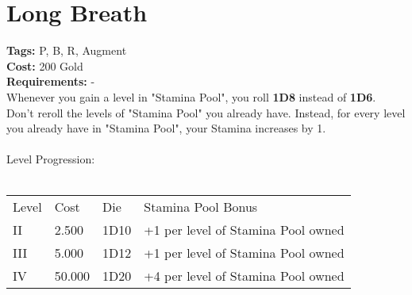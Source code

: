 \section{Long Breath}\label{sec:longbreath}
\textbf{Tags:} P, B, R, Augment\\
\textbf{Cost:} 200 Gold\\
\textbf{Requirements:} -\\
Whenever you gain a level in "Stamina Pool", you roll \textbf{1D8} instead of \textbf{1D6}.
Don't reroll the levels of "Stamina Pool" you already have.
Instead, for every level you already have in "Stamina Pool", your Stamina increases by 1.\\
\\
Level Progression:\\
\\
\begin{tabular}{l | l | l | l}
    Level & Cost & Die & Stamina Pool Bonus\\
    II & 2.500 & 1D10 & +1 per level of Stamina Pool owned\\
    III & 5.000 & 1D12 & +1 per level of Stamina Pool owned\\
    IV & 50.000 & 1D20 & +4 per level of Stamina Pool owned\\
\end{tabular}
